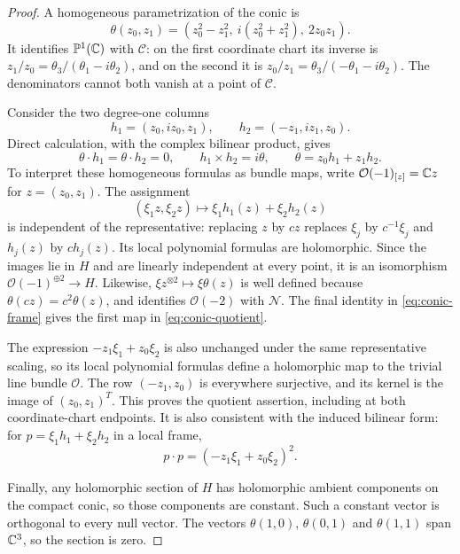 \begin{proof}
A homogeneous parametrization of the conic is
\begin{equation}\label{eq:conic-parametrization}
 \theta(z_0,z_1)
   =(z_0^2-z_1^2,\ i(z_0^2+z_1^2),\ 2z_0z_1).
\end{equation}
It identifies $\mathbb P^1(\mathbb C)$ with $\mathcal C$: on the first coordinate
chart its inverse is
$z_1/z_0=\theta_3/(\theta_1-i\theta_2)$, and on the second it is
$z_0/z_1=\theta_3/(-\theta_1-i\theta_2)$.  The denominators cannot both
vanish at a point of $\mathcal C$.

Consider the two degree-one columns
\[
 h_1=(z_0,iz_0,z_1),\qquad
 h_2=(-z_1,iz_1,z_0).
\]
Direct calculation, with the complex bilinear product, gives
\begin{equation}\label{eq:conic-frame}
 \theta\cdot h_1=\theta\cdot h_2=0,\qquad
 h_1\times h_2=i\theta,\qquad
 \theta=z_0h_1+z_1h_2.
\end{equation}
To interpret these homogeneous formulas as bundle maps, write
$\mathcal O(-1)_{[z]}=\mathbb C z$ for $z=(z_0,z_1)$.
The assignment
\[
 (\xi_1z,\xi_2z)\longmapsto \xi_1h_1(z)+\xi_2h_2(z)
\]
is independent of the representative: replacing $z$ by $cz$ replaces
$\xi_j$ by $c^{-1}\xi_j$ and $h_j(z)$ by $ch_j(z)$.
Its local polynomial formulas are holomorphic. Since the images lie in
$H$ and are linearly independent at every point, it is an isomorphism
$\mathcal O(-1)^{\oplus2}\to H$. Likewise,
$\xi z^{\otimes2}\mapsto\xi\theta(z)$ is well defined because
$\theta(cz)=c^2\theta(z)$, and identifies $\mathcal O(-2)$ with
$\mathcal N$. The final identity in \eqref{eq:conic-frame} gives the
first map in \eqref{eq:conic-quotient}.

The expression $-z_1\xi_1+z_0\xi_2$ is also unchanged under the same
representative scaling, so its local polynomial formulas define a
holomorphic map to the trivial line bundle $\mathcal O$. The row
$(-z_1,z_0)$ is everywhere surjective, and its kernel is the image of
$(z_0,z_1)^T$.
This proves the quotient assertion, including at both coordinate-chart
endpoints.  It is also consistent with the induced bilinear form: for
$p=\xi_1 h_1+\xi_2 h_2$ in a local frame,
\[
 p\cdot p=(-z_1\xi_1+z_0\xi_2)^2.
\]

Finally, any holomorphic section of $H$ has holomorphic ambient components
on the compact conic, so those components are constant.  Such a constant
vector is orthogonal to every null vector.  The vectors
$\theta(1,0)$, $\theta(0,1)$ and $\theta(1,1)$ span $\mathbb C^3$, so the
section is zero.
\end{proof}


